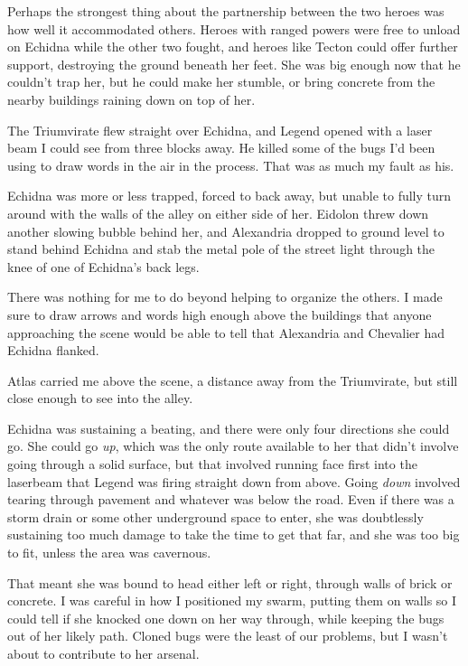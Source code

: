 Perhaps the strongest thing about the partnership between the two heroes was how well it accommodated others.  Heroes with ranged powers were free to unload on Echidna while the other two fought, and heroes like Tecton could offer further support, destroying the ground beneath her feet.  She was big enough now that he couldn't trap her, but he could make her stumble, or bring concrete from the nearby buildings raining down on top of her.



The Triumvirate flew straight over Echidna, and Legend opened with a laser beam I could see from three blocks away.  He killed some of the bugs I'd been using to draw words in the air in the process.  That was as much my fault as his.



Echidna was more or less trapped, forced to back away, but unable to fully turn around with the walls of the alley on either side of her.  Eidolon threw down another slowing bubble behind her, and Alexandria dropped to ground level to stand behind Echidna and stab the metal pole of the street light through the knee of one of Echidna's back legs.



There was nothing for me to do beyond helping to organize the others.  I made sure to draw arrows and words high enough above the buildings that anyone approaching the scene would be able to tell that Alexandria and Chevalier had Echidna flanked.



Atlas carried me above the scene, a distance away from the Triumvirate, but still close enough to see into the alley.



Echidna was sustaining a beating, and there were only four directions she could go.  She could go \emph{up}, which was the only route available to her that didn't involve going through a solid surface, but that involved running face first into the laserbeam that Legend was firing straight down from above.  Going \emph{down} involved tearing through pavement and whatever was below the road.  Even if there was a storm drain or some other underground space to enter, she was doubtlessly sustaining too much damage to take the time to get that far, and she was too big to fit, unless the area was cavernous.



That meant she was bound to head either left or right, through walls of brick or concrete.  I was careful in how I positioned my swarm, putting them on walls so I could tell if she knocked one down on her way through, while keeping the bugs out of her likely path.  Cloned bugs were the least of our problems, but I wasn't about to contribute to her arsenal.



